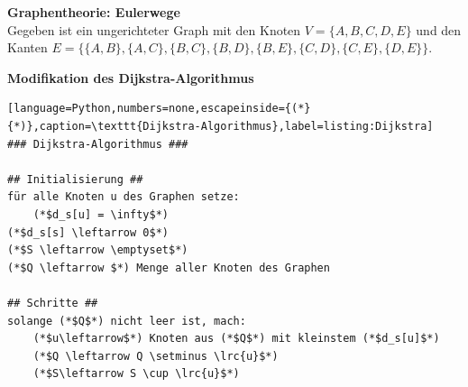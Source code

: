\begin{questions}
\question \textbf{Graphentheorie: Eulerwege} \\
Gegeben ist ein ungerichteter Graph mit den Knoten $V = \{A, B, C, D, E\}$ und den Kanten $E = \{\{A,B\}, \{A,C\}, \{B,C\}, \{B,D\}, \{B,E\}, \{C,D\}, \{C,E\}, \{D,E\}\}$.
\droptotalpoints
{}

\clearpage
\question[3] \textbf{Modifikation des Dijkstra-Algorithmus} \\
\begin{lstlisting}[language=Python,numbers=none,escapeinside={(*}{*)},caption=\texttt{Dijkstra-Algorithmus},label=listing:Dijkstra]
### Dijkstra-Algorithmus ###

## Initialisierung ##
für alle Knoten u des Graphen setze:
    (*$d_s[u] = \infty$*)
(*$d_s[s] \leftarrow 0$*)
(*$S \leftarrow \emptyset$*)
(*$Q \leftarrow $*) Menge aller Knoten des Graphen

## Schritte ##
solange (*$Q$*) nicht leer ist, mach:
    (*$u\leftarrow$*) Knoten aus (*$Q$*) mit kleinstem (*$d_s[u]$*)
    (*$Q \leftarrow Q \setminus \lrc{u}$*)
    (*$S\leftarrow S \cup \lrc{u}$*)


\end{lstlisting}
\end{questions}
